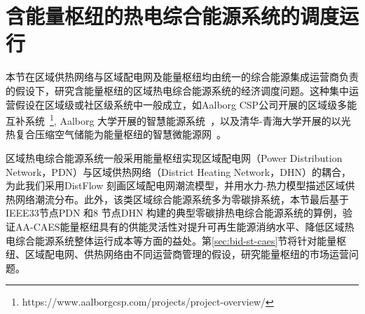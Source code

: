 %
%

\section{含能量枢纽的热电综合能源系统的调度运行}
\label{sec:st-caes-dispatch}

本节在区域供热网络与区域配电网及能量枢纽均由统一的综合能源集成运营商负责的假设下，研究含能量枢纽的区域热电综合能源系统的经济调度问题。这种集中运营假设在区域级或社区级系统中一般成立，如Aalborg CSP公司开展的区域级多能互补系统~\footnote{https://www.aalborgcsp.com/projects/project-overview/}, Aalborg 大学开展的智慧能源系统~\cite{Smart-Energy-Systems-15}，以及清华-青海大学开展的以光热复合压缩空气储能为能量枢纽的智慧微能源网~\cite{ST-CAES-CN-16-Rui, ST-CAES-17}。

区域热电综合能源系统一般采用能量枢纽实现区域配电网（Power Distribution Network，PDN）与区域供热网络（District Heating Network，DHN）的耦合，为此我们采用DistFlow 刻画区域配电网潮流模型，并用水力-热力模型描述区域供热网络潮流分布。此外，该类区域综合能源系统多为零碳排系统，本节最后基于IEEE33节点PDN 和8 节点DHN 构建的典型零碳排热电综合能源系统的算例，验证AA-CAES能量枢纽具有的供能灵活性对提升可再生能源消纳水平、降低区域热电综合能源系统整体运行成本等方面的益处。第\ref{sec:bid-st-caes}节将针对能量枢纽、区域配电网、供热网络由不同运营商管理的假设，研究能量枢纽的市场运营问题。

